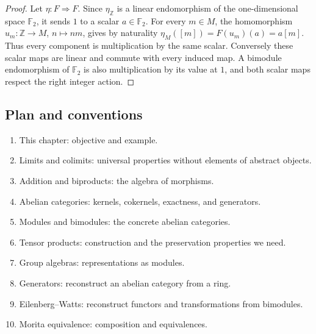 \documentclass[11pt,a4paper]{article}
\theoremstyle{plain}
\theoremstyle{definition}
\begin{document}
\begin{proof}

Let \(\eta:F\Rightarrow F\). Since \(\eta_{\mathbb Z}\) is a linear endomorphism of the one-dimensional space \(\mathbb F_2\), it sends \(1\) to a scalar \(a\in\mathbb F_2\). For every \(m\in M\), the homomorphism \(u_m:\mathbb Z\to M\), \(n\mapsto nm\), gives by naturality \(\eta_M([m])=F(u_m)(a)=a[m]\). Thus every component is multiplication by the same scalar. Conversely these scalar maps are linear and commute with every induced map. A bimodule endomorphism of \(\mathbb F_2\) is also multiplication by its value at \(1\), and both scalar maps respect the right integer action.


\end{proof}
 
\subsection{Plan and conventions}

\begin{enumerate}
 
\item This chapter: objective and example.

\item Limits and colimits: universal properties without elements of abstract objects.

\item Addition and biproducts: the algebra of morphisms.

\item Abelian categories: kernels, cokernels, exactness, and generators.

\item Modules and bimodules: the concrete abelian categories.

\item Tensor products: construction and the preservation properties we need.

\item Group algebras: representations as modules.

\item Generators: reconstruct an abelian category from a ring.

\item Eilenberg--Watts: reconstruct functors and transformations from bimodules.

\item Morita equivalence: composition and equivalences.

\end{enumerate}
 
\end{document}
